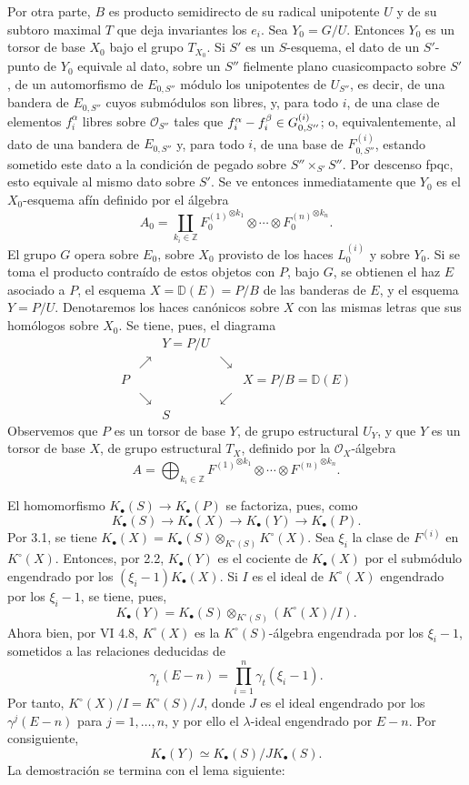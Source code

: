 Por otra parte, $B$ es producto semidirecto de su radical unipotente $U$ y de su subtoro maximal $T$ que deja invariantes los $e_i$. Sea $Y_0=G/U$. Entonces $Y_0$ es un torsor de base $X_0$ bajo el grupo $T_{X_0}$. Si $S'$ es un $S$-esquema, el dato de un $S'$-punto de $Y_0$ equivale al dato, sobre un $S''$ fielmente plano cuasicompacto sobre $S'$, de un automorfismo de $E_{0,S''}$ módulo los unipotentes de $U_{S''}$, es decir, de una bandera de $E_{0,S''}$ cuyos submódulos son libres, y, para todo $i$, de una clase de elementos $f_i^\alpha$ libres sobre $\mathcal O_{S''}$ tales que $f_i^\alpha-f_i^\beta\in \sisi{G_{0,S''}^{(i+1)}}{G_{0,S''}^{(i)}}$; o, equivalentemente, al dato de una bandera de $E_{0,S''}$ y, para todo $i$, de una base de $F_{0,S''}^{(i)}$, estando sometido este dato a la condición de pegado sobre $S''\times_{S'}S''$. Por descenso fpqc, esto equivale al mismo dato sobre $S'$. Se ve entonces inmediatamente que $Y_0$ es el $X_0$-esquema afín definido por el álgebra
\[
A_0=\coprod_{k_i\in\mathbb Z}{F_0^{(1)}}^{\otimes k_1}\otimes\cdots\otimes{F_0^{(n)}}^{\otimes k_n}.
\]
El grupo $G$ opera sobre $E_0$, sobre $X_0$ provisto de los haces $L_0^{(i)}$ y sobre $Y_0$. Si se toma el producto contraído de estos objetos con $P$, bajo $G$, se obtienen el haz $E$ asociado a $P$, el esquema $X=\mathbb D(E)=P/B$ de las banderas de $E$, y el esquema $Y=P/U$. Denotaremos los haces canónicos sobre $X$ con las mismas letras que sus homólogos sobre $X_0$. Se tiene, pues, el diagrama
\[
\begin{array}{ccccc}
&& Y=P/U &&\\[-0.2em]
& \nearrow && \searrow &\\[-0.2em]
P &&&& X=P/B=\mathbb D(E)\\[-0.2em]
& \searrow && \swarrow &\\[-0.2em]
&& S &&
\end{array}
\]
Observemos que $P$ es un torsor de base $Y$, de grupo estructural $U_Y$, y que $Y$ es un torsor de base $X$, de grupo estructural $T_X$, definido por la $\mathcal O_X$-álgebra
\[
A=\bigoplus_{k_i\in\mathbb Z}{F^{(1)}}^{\otimes k_1}\otimes\cdots\otimes{F^{(n)}}^{\otimes k_n}.
\]

El homomorfismo $K_\bullet(S)\to K_\bullet(P)$ se factoriza, pues, como
\[
K_\bullet(S)\longrightarrow K_\bullet(X)\longrightarrow K_\bullet(Y)\longrightarrow K_\bullet(P).
\]
Por 3.1, se tiene $K_\bullet(X)=K_\bullet(S)\otimes_{K^\circ(S)}K^\circ(X)$. Sea $\xi_i$ la clase de $F^{(i)}$ en $K^\circ(X)$. Entonces, por 2.2, $K_\bullet(Y)$ es el cociente de $K_\bullet(X)$ por el submódulo engendrado por los $(\xi_i-1)K_\bullet(X)$. Si $I$ es el ideal de $K^\circ(X)$ engendrado por los $\xi_i-1$, se tiene, pues,
\[
K_\bullet(Y)=K_\bullet(S)\otimes_{K^\circ(S)}(K^\circ(X)/I).
\]
Ahora bien, por VI 4.8, $K^\circ(X)$ es la $K^\circ(S)$-álgebra engendrada por los $\xi_i-1$, sometidos a las relaciones deducidas de
\[
\gamma_t(E-n)=\prod_{i=1}^n\gamma_t(\xi_i-1).
\]
Por tanto, $K^\circ(X)/I=K^\circ(S)/J$, donde $J$ es el ideal engendrado por los $\gamma^j(E-n)$ para $j=1,\ldots,n$, y por ello el $\lambda$-ideal engendrado por $E-n$. Por consiguiente,
\[
K_\bullet(Y)\simeq K_\bullet(S)/J K_\bullet(S).
\]
La demostración se termina con el lema siguiente:

